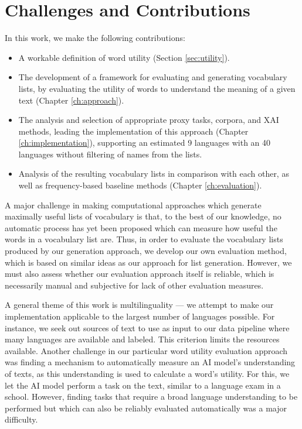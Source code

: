 \section{Challenges and Contributions}
In this work, we make the following contributions:

\begin{itemize}
	\item A workable definition of word utility (Section \ref{sec:utility}).
	\item The development of a framework for evaluating and generating vocabulary lists, by evaluating the utility of words to understand the meaning of a given text (Chapter \ref{ch:approach}).
	\item The analysis and selection of appropriate proxy tasks, corpora, and XAI methods, leading the implementation of this approach (Chapter \ref{ch:implementation}), supporting an estimated 9 languages with an 40 languages without filtering of names from the lists.
	\item Analysis of the resulting vocabulary lists in comparison with each other, as well as frequency-based baseline methods (Chapter \ref{ch:evaluation}).
\end{itemize}

A major challenge in making computational approaches which generate maximally useful lists of vocabulary is that, to the best of our knowledge, no automatic process has yet been proposed which can measure how useful the words in a vocabulary list are. 
Thus, in order to evaluate the vocabulary lists produced by our generation approach, we develop our own evaluation method, which is based on similar ideas as our approach for list generation.
However, we must also assess whether our evaluation approach itself is reliable, which is necessarily manual and subjective for lack of other evaluation measures.

A general theme of this work is multilinguality --- we attempt to make our implementation applicable to the largest number of languages possible.
For instance, we seek out sources of text to use as input to our data pipeline where many languages are available and labeled.
This criterion limits the resources available.
Another challenge in our particular word utility evaluation approach was finding a mechanism to automatically measure an AI model's understanding of texts, as this understanding is used to calculate a word's utility.
For this, we let the AI model perform a task on the text, similar to a language exam in a school.
However, finding tasks that require a broad language understanding to be performed but which can also be reliably evaluated automatically was a major difficulty.

